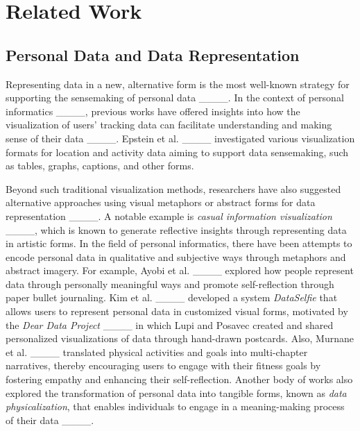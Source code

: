 \section{Related Work}
\subsection{Personal Data and Data Representation}
Representing data in a new, alternative form is the most well-known strategy for supporting the sensemaking of personal data ____. In the context of personal informatics ____, previous works have offered insights into how the visualization of users’ tracking data can facilitate understanding and making sense of their data ____. Epstein et al. ____ 
investigated various visualization formats for location and activity data aiming to support data sensemaking, such as tables, graphs, captions, and other forms.

Beyond such traditional visualization methods, researchers have also suggested alternative approaches using visual metaphors or abstract forms for data representation ____. A notable example is \textit{casual information visualization} ____, which is known to generate reflective insights through representing data in artistic forms. In the field of personal informatics, there have been attempts to encode personal data in qualitative and subjective ways through metaphors and abstract imagery. For example, Ayobi et al. ____ explored how people represent data through personally meaningful ways and promote self-reflection through paper bullet journaling. Kim et al. ____ developed a system \textit{DataSelfie} that allows users to represent personal data in customized visual forms, motivated by the \textit{Dear Data Project} ____ in which  Lupi and
Posavec created and shared personalized visualizations of data through hand-drawn postcards. Also, Murnane et al. ____ translated physical activities and goals into multi-chapter narratives, thereby encouraging users to engage with their fitness goals by fostering empathy and enhancing their self-reflection. Another body of works also explored the transformation of personal data into tangible forms, known as \textit{data physicalization}, that enables individuals to engage in a meaning-making process of their data ____.

